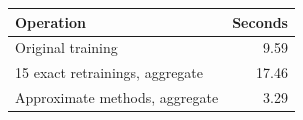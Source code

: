 \begin{tabular}{lr}
\toprule
Operation & Seconds \\
\midrule
Original training & 9.59 \\
15 exact retrainings, aggregate & 17.46 \\
Approximate methods, aggregate & 3.29 \\
\bottomrule
\end{tabular}
